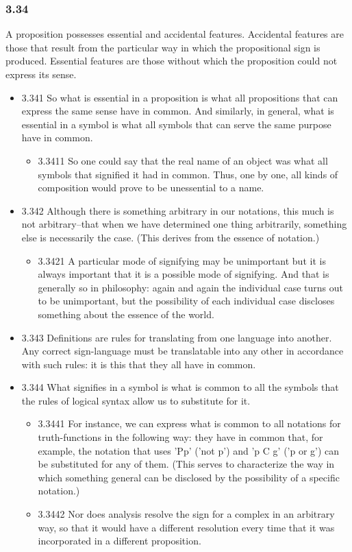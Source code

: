 \documentclass[11pt]{article}
\begin{document}
\subsubsection*{3.34}
\label{sec:org5cfe32e}
A proposition possesses essential and accidental features. Accidental
features are those that result from the particular way in which the
propositional sign is produced. Essential features are those without which
the proposition could not express its sense.
\begin{itemize}
\item 3.341
\label{sec:org754923d}
So what is essential in a proposition is what all propositions that
can express the same sense have in common. And similarly, in general, what
is essential in a symbol is what all symbols that can serve the same
purpose have in common.
\begin{itemize}
\item 3.3411
\label{sec:orge54bd51}
So one could say that the real name of an object was what all
symbols that signified it had in common. Thus, one by one, all kinds of
composition would prove to be unessential to a name.
\end{itemize}
\item 3.342
\label{sec:orgd62bbe8}
Although there is something arbitrary in our notations, this much is
not arbitrary--that when we have determined one thing arbitrarily,
something else is necessarily the case. (This derives from the essence of
notation.)
\begin{itemize}
\item 3.3421
\label{sec:org9da63c9}
A particular mode of signifying may be unimportant but it is always
important that it is a possible mode of signifying. And that is generally
so in philosophy: again and again the individual case turns out to be
unimportant, but the possibility of each individual case discloses
something about the essence of the world.
\end{itemize}
\item 3.343
\label{sec:org604223f}
Definitions are rules for translating from one language into another.
Any correct sign-language must be translatable into any other in accordance
with such rules: it is this that they all have in common.
\item 3.344
\label{sec:orgb72c1bb}
What signifies in a symbol is what is common to all the symbols that
the rules of logical syntax allow us to substitute for it.
\begin{itemize}
\item 3.3441
\label{sec:org211a366}
For instance, we can express what is common to all notations for
truth-functions in the following way: they have in common that, for
example, the notation that uses 'Pp' ('not p') and 'p C g' ('p or g') can
be substituted for any of them. (This serves to characterize the way in
which something general can be disclosed by the possibility of a specific
notation.)
\item 3.3442
\label{sec:org497f562}
Nor does analysis resolve the sign for a complex in an arbitrary
way, so that it would have a different resolution every time that it was
incorporated in a different proposition.
\end{itemize}
\end{itemize}
\end{document}
